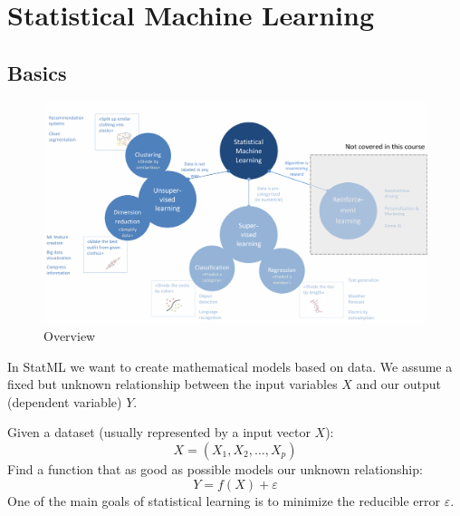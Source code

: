 \documentclass[../Main.tex]{subfiles}
\begin{document}
\chapter{Statistical Machine Learning}

\intro{

}

\section{Basics}
\begin{figure}[H]
    \centering
    \includegraphics[width=1\linewidth]{Images/overview.png}
    \caption{Overview}
\end{figure}



In StatML we want to create mathematical models based on data.
We assume a fixed but unknown relationship between the input variables \(X\) and our
output (dependent variable) \(Y\).

Given a dataset (usually represented by a input vector \(X\)):
\begin{equation}
    X = (X_1, X_2, \dots, X_p)
\end{equation}
Find a function that as good as possible models our unknown relationship:
\begin{equation}
    Y = f(X) + \varepsilon
\end{equation}
One of the main goals of statistical learning is to minimize the reducible error \(\varepsilon\).
\end{document}
